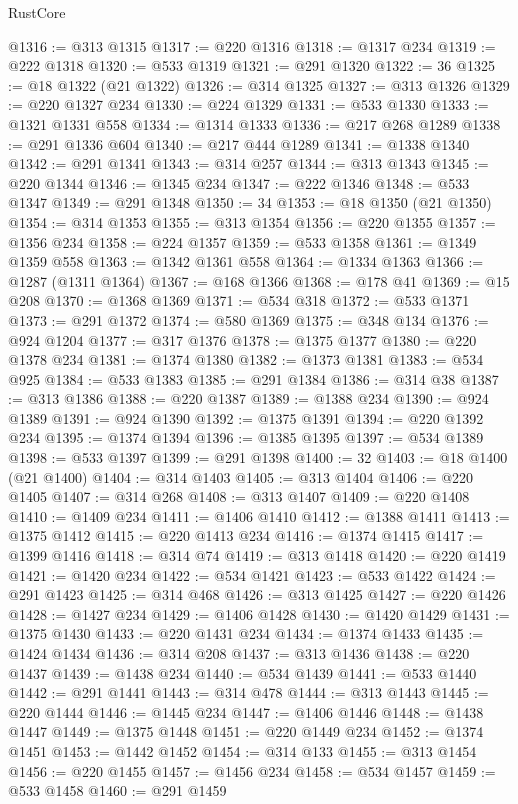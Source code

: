 \begin{lexlean}{RustCore}
\begin{coremodule}
@1316 := @313 @1315
@1317 := @220 @1316
@1318 := @1317 @234
@1319 := @222 @1318
@1320 := @533 @1319
@1321 := @291 @1320
@1322 := 36
@1325 := @18 @1322 (@21 @1322)
@1326 := @314 @1325
@1327 := @313 @1326
@1329 := @220 @1327 @234
@1330 := @224 @1329
@1331 := @533 @1330
@1333 := @1321 @1331 @558
@1334 := @1314 @1333
@1336 := @217 @268 @1289
@1338 := @291 @1336 @604
@1340 := @217 @444 @1289
@1341 := @1338 @1340
@1342 := @291 @1341
@1343 := @314 @257
@1344 := @313 @1343
@1345 := @220 @1344
@1346 := @1345 @234
@1347 := @222 @1346
@1348 := @533 @1347
@1349 := @291 @1348
@1350 := 34
@1353 := @18 @1350 (@21 @1350)
@1354 := @314 @1353
@1355 := @313 @1354
@1356 := @220 @1355
@1357 := @1356 @234
@1358 := @224 @1357
@1359 := @533 @1358
@1361 := @1349 @1359 @558
@1363 := @1342 @1361 @558
@1364 := @1334 @1363
@1366 := @1287 (@1311 @1364)
@1367 := @168 @1366
@1368 := @178 @41
@1369 := @15 @208
@1370 := @1368 @1369
@1371 := @534 @318
@1372 := @533 @1371
@1373 := @291 @1372
@1374 := @580 @1369
@1375 := @348 @134
@1376 := @924 @1204
@1377 := @317 @1376
@1378 := @1375 @1377
@1380 := @220 @1378 @234
@1381 := @1374 @1380
@1382 := @1373 @1381
@1383 := @534 @925
@1384 := @533 @1383
@1385 := @291 @1384
@1386 := @314 @38
@1387 := @313 @1386
@1388 := @220 @1387
@1389 := @1388 @234
@1390 := @924 @1389
@1391 := @924 @1390
@1392 := @1375 @1391
@1394 := @220 @1392 @234
@1395 := @1374 @1394
@1396 := @1385 @1395
@1397 := @534 @1389
@1398 := @533 @1397
@1399 := @291 @1398
@1400 := 32
@1403 := @18 @1400 (@21 @1400)
@1404 := @314 @1403
@1405 := @313 @1404
@1406 := @220 @1405
@1407 := @314 @268
@1408 := @313 @1407
@1409 := @220 @1408
@1410 := @1409 @234
@1411 := @1406 @1410
@1412 := @1388 @1411
@1413 := @1375 @1412
@1415 := @220 @1413 @234
@1416 := @1374 @1415
@1417 := @1399 @1416
@1418 := @314 @74
@1419 := @313 @1418
@1420 := @220 @1419
@1421 := @1420 @234
@1422 := @534 @1421
@1423 := @533 @1422
@1424 := @291 @1423
@1425 := @314 @468
@1426 := @313 @1425
@1427 := @220 @1426
@1428 := @1427 @234
@1429 := @1406 @1428
@1430 := @1420 @1429
@1431 := @1375 @1430
@1433 := @220 @1431 @234
@1434 := @1374 @1433
@1435 := @1424 @1434
@1436 := @314 @208
@1437 := @313 @1436
@1438 := @220 @1437
@1439 := @1438 @234
@1440 := @534 @1439
@1441 := @533 @1440
@1442 := @291 @1441
@1443 := @314 @478
@1444 := @313 @1443
@1445 := @220 @1444
@1446 := @1445 @234
@1447 := @1406 @1446
@1448 := @1438 @1447
@1449 := @1375 @1448
@1451 := @220 @1449 @234
@1452 := @1374 @1451
@1453 := @1442 @1452
@1454 := @314 @133
@1455 := @313 @1454
@1456 := @220 @1455
@1457 := @1456 @234
@1458 := @534 @1457
@1459 := @533 @1458
@1460 := @291 @1459

\end{coremodule}
\end{lexlean}
